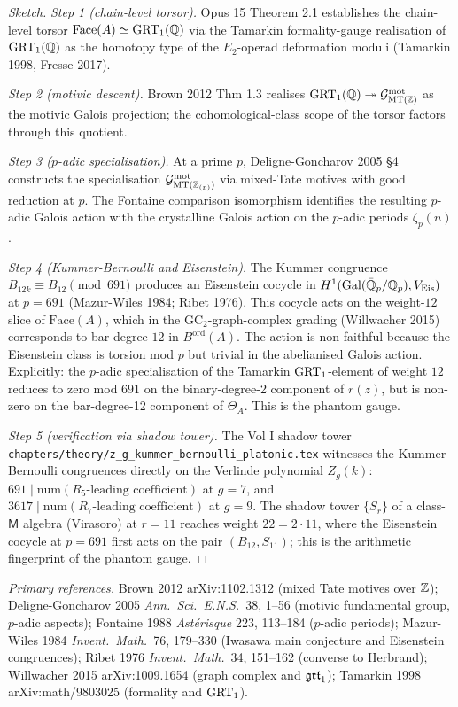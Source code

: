 \begin{proof}[Sketch]
\emph{Step 1 (chain-level torsor).}
Opus 15 Theorem 2.1 establishes the chain-level torsor
$\mathrm{Face}(A) \simeq \mathrm{GRT}_1(\mathbb{Q})$ via the Tamarkin formality-gauge
realisation of $\mathrm{GRT}_1(\mathbb{Q})$ as the homotopy type of the $E_2$-operad
deformation moduli (Tamarkin 1998, Fresse 2017).

\emph{Step 2 (motivic descent).}
Brown 2012 Thm 1.3 realises $\mathrm{GRT}_1(\mathbb{Q}) \twoheadrightarrow \mathcal{G}^{\mathrm{mot}}_{\mathrm{MT}(\mathbb{Z})}$ as the motivic
Galois projection; the cohomological-class scope of the torsor factors
through this quotient.

\emph{Step 3 ($p$-adic specialisation).}
At a prime $p$, Deligne-Goncharov 2005 \S4 constructs the specialisation
$\mathcal{G}^{\mathrm{mot}}_{\mathrm{MT}(\mathbb{Z}_{(p)})}$ via mixed-Tate motives with good reduction at
$p$. The Fontaine comparison isomorphism identifies the resulting
$p$-adic Galois action with the crystalline Galois action on the
$p$-adic periods $\zeta_p(n)$.

\emph{Step 4 (Kummer-Bernoulli and Eisenstein).}
The Kummer congruence $B_{12k} \equiv B_{12} \pmod{691}$ produces an
Eisenstein cocycle in $H^1(\mathrm{Gal}(\bar{\mathbb{Q}}_p/\mathbb{Q}_p), V_{\mathrm{Eis}})$
at $p = 691$ (Mazur-Wiles 1984; Ribet 1976). This cocycle acts on the
weight-$12$ slice of $\mathrm{Face}(A)$, which in the
$\mathrm{GC}_2$-graph-complex grading (Willwacher 2015) corresponds to
bar-degree $12$ in $B^{\mathrm{ord}}(A)$. The action is non-faithful
because the Eisenstein class is torsion mod $p$ but trivial in the
abelianised Galois action. Explicitly: the $p$-adic specialisation of
the Tamarkin $\mathrm{GRT}_1$-element of weight $12$ reduces to zero mod $691$
on the binary-degree-2 component of $r(z)$, but is non-zero on the
bar-degree-12 component of $\Theta_A$. This is the phantom gauge.

\emph{Step 5 (verification via shadow tower).}
The Vol I shadow tower
\texttt{chapters/theory/z\_g\_kummer\_bernoulli\_platonic.tex} witnesses
the Kummer-Bernoulli congruences directly on the Verlinde polynomial
$Z_g(k)$: $691 \mid \mathrm{num}(R_5\text{-leading coefficient})$ at
$g = 7$, and $3617 \mid \mathrm{num}(R_7\text{-leading coefficient})$
at $g = 9$. The shadow tower $\{S_r\}$ of a class-$\mathsf{M}$ algebra
(Virasoro) at $r = 11$ reaches weight $22 = 2 \cdot 11$, where the
Eisenstein cocycle at $p = 691$ first acts on the pair
$(B_{12}, S_{11})$; this is the arithmetic fingerprint of the phantom
gauge.
\end{proof}

\emph{Primary references.}
Brown 2012 arXiv:1102.1312 (mixed Tate motives over $\mathbb{Z}$);
Deligne-Goncharov 2005 \emph{Ann.\ Sci.\ E.N.S.}\ 38, 1--56 (motivic
fundamental group, $p$-adic aspects);
Fontaine 1988 \emph{Ast\'erisque} 223, 113--184 ($p$-adic periods);
Mazur-Wiles 1984 \emph{Invent.\ Math.}\ 76, 179--330 (Iwasawa main
conjecture and Eisenstein congruences);
Ribet 1976 \emph{Invent.\ Math.}\ 34, 151--162 (converse to Herbrand);
Willwacher 2015 arXiv:1009.1654 (graph complex and $\mathfrak{grt}_1$);
Tamarkin 1998 arXiv:math/9803025 (formality and $\mathrm{GRT}_1$).

